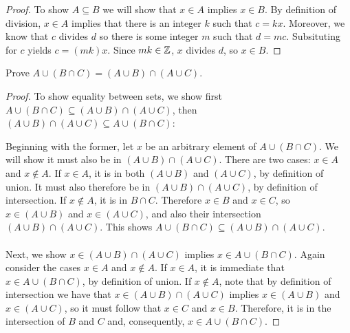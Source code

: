 \documentclass[]{exam}
\begin{document}
\begin{questions}
\begin{solution}
\begin{proof}
To show $A \subseteq B$ we will show that $x \in A$ implies $x \in B$.
By definition of division, $x \in A$ implies that there is an integer
$k$ such that $c = kx$. Moreover, we know that $c$ divides $d$ so
there is some integer $m$ such that $d = mc$. Subsituting for
$c$ yields $c = (mk)x$. Since $mk \in \mathbb{Z}$, $x$ divides $d$, so $x \in B$.
\end{proof}
\end{solution}


\question
Prove $A \cup (B \cap C) = (A \cup B) \cap (A \cup C)$.
\begin{solution}
\begin{proof}
To show equality between sets, we show first $A \cup (B \cap C) \subseteq (A
    \cup B) \cap (A \cup C)$, then 
$(A \cup B) \cap (A \cup C) \subseteq A \cup (B \cap C)$:

Beginning with the former, let $x$ be an arbitrary element of 
$A \cup (B \cap C)$. We will show it must also be in $(A \cup B) \cap (A \cup C)$. 
There are two cases: $x \in A$ and $x \notin A$. If $x \in A$, it is in both
 $(A \cup B)$ and $(A \cup C)$, by definition of union. It must also therefore
 be in $(A \cup B) \cap (A \cup C)$, by definition of intersection. If $x \notin A$, 
 it is in $B \cap C$. Therefore $x \in B$ and $x \in C$, so $x \in (A \cup B)$ and 
 $x \in (A \cup C)$, and also their intersection $(A \cup B) \cap (A \cup C)$.
This shows $A \cup (B \cap C) \subseteq (A \cup B) \cap (A \cup C)$.
\\~\\
Next, we show $x \in (A \cup B) \cap (A \cup C)$ implies 
$x \in A \cup (B \cap C)$. Again consider the cases $x \in A$ and $x \notin A$.
If $x \in A$, it is immediate that $x \in A \cup (B \cap C)$, by definition
of union. If $x \notin A$, note that by definition of intersection we have that
$x \in (A \cup B) \cap (A \cup C)$ implies $x \in (A \cup B)$ and $x \in (A \cup C)$,
so it must follow that $x \in C$ and $x \in B$. Therefore, it is in the
intersection of $B$ and $C$ and, consequently, $x \in A \cup (B \cap C)$.

\end{proof}

\end{solution}



\end{questions}
\end{document}
